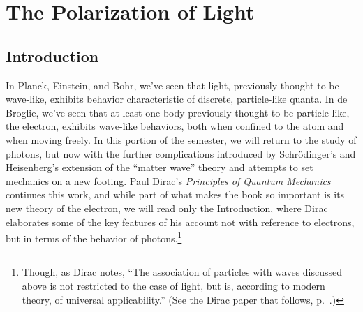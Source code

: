 \chapter{The Polarization of Light}



\section*{Introduction}

In Planck, Einstein, and Bohr, we’ve seen that light, previously thought to be wave-like, exhibits behavior characteristic of discrete, particle-like quanta. In de Broglie, we’ve seen that at least one body previously thought to be particle-like, the electron, exhibits wave-like behaviors, both when confined to the atom and when moving freely. In this portion of the semester, we will return to the study of photons, but now with the further complications introduced by Schr\"odinger’s and Heisenberg’s extension of the “matter wave” theory and attempts to set mechanics on a new footing. Paul Dirac’s \emph{Principles of Quantum Mechanics} continues this work, and while part of what makes the book so important is its new theory of the electron, we will read only the Introduction, where Dirac
elaborates some of the key features of his account not with reference to electrons, but in terms of the behavior of photons.\footnote{Though, as Dirac notes, ``The association of particles with waves discussed above is not
	restricted to the case of light, but is, according to modern theory, of universal applicability.'' (See the Dirac paper that
	follows, p.\ \pageref{s:dirac_partwave}.)}


